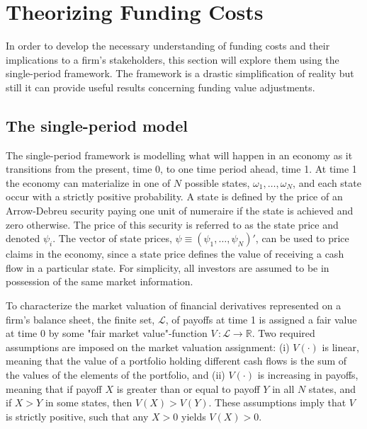 \documentclass[main.tex]{subfiles}
\begin{document}
    \section{Theorizing Funding Costs}
    \label{sec:single-period-model}
        In order to develop the necessary understanding of funding costs and their implications to a firm's stakeholders, this section will explore them using the single-period framework.
        The framework is a drastic simplification of reality but still it can provide useful results concerning funding value adjustments.

    \subsection{The single-period model}
        The single-period framework is modelling what will happen in an economy as it transitions from the present, time 0, to one time period ahead, time 1.
        At time 1 the economy can materialize in one of $N$ possible states, $\omega_{1}, \dots, \omega_{N}$, and each state occur with a strictly positive probability.
        A state is defined by the price of an Arrow-Debreu security paying one unit of numeraire if the state is achieved and zero otherwise.
        The price of this security is referred to as the state price and denoted $\psi_{i}$.
        The vector of state prices, $\psi \equiv \left(\psi_{1}, \dots, \psi_{N}\right)'$, can be used to price claims in the economy, since a state price defines the value of receiving a cash flow in a particular state.
        For simplicity, all investors are assumed to be in possession of the same market information.

        To characterize the market valuation of financial derivatives represented on a firm's balance sheet, the finite set, $\mathcal{L}$, of payoffs at time 1 is assigned a fair value at time 0 by some "fair market value"-function $V\, \colon \mathcal{L} \rightarrow \mathbb{R}$.
        Two required assumptions are imposed on the market valuation assignment: 
        (i) $V(\cdot)$ is linear, meaning that the value of a portfolio holding different cash flows is the sum of the values of the elements of the portfolio, and 
        (ii) $V(\cdot)$ is increasing in payoffs, meaning that if payoff $X$ is greater than or equal to payoff $Y$ in all $N$ states, and if $X>Y$ in some states, then $V(X)>V(Y)$.
        These assumptions imply that $V$ is strictly positive, such that any $X>0$ yields $V(X) > 0$.
        
\end{document}
